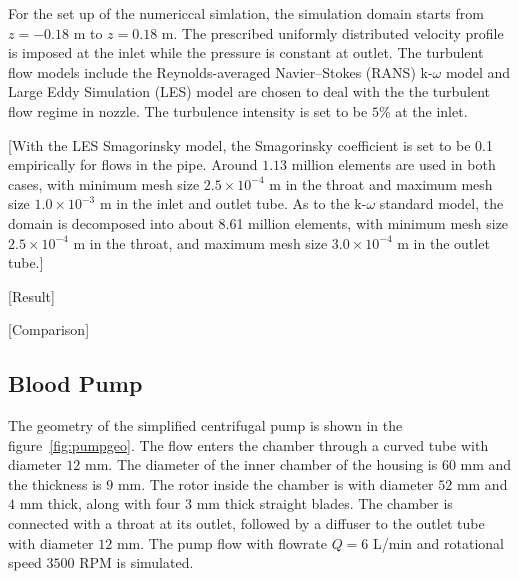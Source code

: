For the set up of the numericcal simlation, the simulation domain starts from $z=-0.18$ m to $z=0.18$ m. The prescribed uniformly distributed velocity profile is imposed at the inlet while the pressure is constant at outlet. The turbulent flow models include the Reynolds-averaged Navier–Stokes (RANS) k-$\omega$ model and Large Eddy Simulation (LES) model are chosen to deal with the the turbulent flow regime in nozzle. The turbulence intensity is set to be $5$\% at the inlet. 

[With the LES Smagorinsky model, the Smagorinsky coefficient is set to be 0.1 empirically for flows in the pipe. Around $1.13$ million elements are used in both cases, with minimum mesh size $2.5\times10^{-4}$ m in the throat and maximum mesh size $1.0\times10^{-3}$ m in the inlet and outlet tube. As to the k-$\omega$ standard model, the domain is decomposed into about 8.61 million elements, with minimum mesh size $2.5\times10^{-4}$ m in the throat, and maximum mesh size $3.0\times10^{-4}$ m in the outlet tube.]  

[Result]

[Comparison]

\subsection{Blood Pump}

The geometry of the simplified centrifugal pump is shown in the figure~\ref{fig:pumpgeo}. The flow enters the chamber through a curved tube with diameter $12$ mm. The diameter of the inner chamber of the housing is $60$ mm and the thickness is $9$ mm. The rotor inside the chamber is with diameter $52$ mm and $4$ mm thick, along with four $3$ mm thick straight blades. The chamber is connected with a throat at its outlet, followed by a diffuser to the outlet tube with diameter $12$ mm. The pump flow with flowrate $Q = 6$ L/min and rotational speed $3500$ RPM is simulated. 

